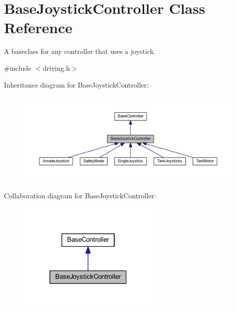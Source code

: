 \hypertarget{class_base_joystick_controller}{\section{\-Base\-Joystick\-Controller \-Class \-Reference}
\label{class_base_joystick_controller}
}


\-A baseclass for any controller that uses a joystick.  




{\ttfamily \#include $<$driving.\-h$>$}



\-Inheritance diagram for \-Base\-Joystick\-Controller\-:\nopagebreak
\begin{figure}[H]
\begin{center}
\leavevmode
\includegraphics[width=350pt]{class_base_joystick_controller__inherit__graph}
\end{center}
\end{figure}


\-Collaboration diagram for \-Base\-Joystick\-Controller\-:\nopagebreak
\begin{figure}[H]
\begin{center}
\leavevmode
\includegraphics[width=196pt]{class_base_joystick_controller__coll__graph}
\end{center}
\end{figure}
